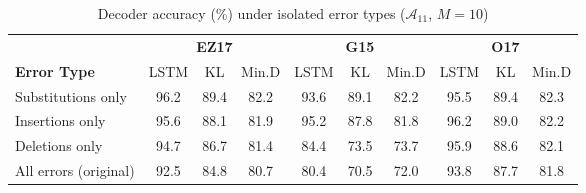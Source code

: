 
\begin{table}[h]
\caption{Decoder accuracy (\%) under isolated error types ($\mathcal{A}_{11}$, $M=10$)}
\centering
\renewcommand{\arraystretch}{1.2}
\setlength{\tabcolsep}{3pt}
\begin{tabular}{l|ccc|ccc|ccc}
\toprule
& \multicolumn{3}{c|}{\textbf{EZ17}} 
& \multicolumn{3}{c|}{\textbf{G15}} 
& \multicolumn{3}{c}{\textbf{O17}} \\
\cmidrule(lr){2-4} \cmidrule(lr){5-7} \cmidrule(l){8-10}
\textbf{Error Type} & LSTM & KL & Min.D & LSTM & KL & Min.D & LSTM & KL & Min.D \\
\midrule
Substitutions only & 96.2 & 89.4 & 82.2 & 93.6 & 89.1 & 82.2 & 95.5 & 89.4 & 82.3 \\
Insertions only & 95.6 & 88.1 & 81.9 & 95.2 & 87.8 & 81.8 & 96.2 & 89.0 & 82.2 \\
Deletions only & 94.7 & 86.7 & 81.4 & 84.4 & 73.5 & 73.7 & 95.9 & 88.6 & 82.1 \\
\midrule
All errors (original) & 92.5 & 84.8 & 80.7 & 80.4 & 70.5 & 72.0 & 93.8 & 87.7 & 81.8 \\
\bottomrule
\end{tabular}
\label{Table:ErrorTypeIsolation}
\end{table}
